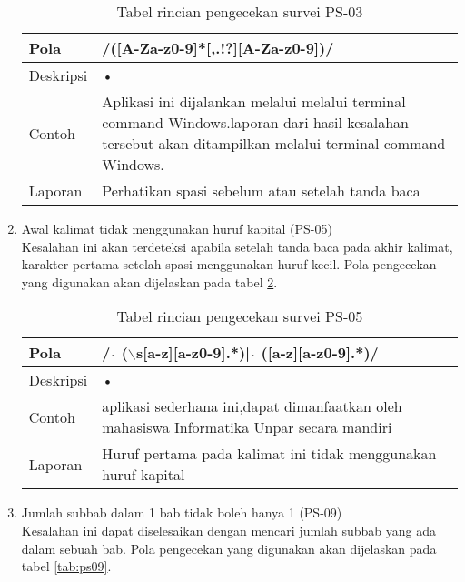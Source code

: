 \begin{enumerate}
	\begin{table}[H]
		\renewcommand{\arraystretch}{1.5}
		\caption {Tabel rincian pengecekan survei PS-03} 
		\label{tab:ps03}
		\begin{center}
			\begin{tabular}{|p{3.5cm} |p{10.5cm}|}
			\hline 
			Pola & /([A-Za-z0-9]*[,.!?][A-Za-z0-9])/ \\ 
			\hline 
			Deskripsi & • \\ 
			\hline 
			Contoh & Aplikasi ini dijalankan melalui melalui terminal command Windows.laporan dari hasil kesalahan tersebut akan ditampilkan melalui terminal command Windows. \\ 
			\hline 
			Laporan & Perhatikan spasi sebelum atau setelah tanda baca \\ 
			\hline
			\end{tabular}
		\end{center}
	\end{table}
	
	\item Awal kalimat tidak menggunakan huruf kapital (PS-05) \\
	Kesalahan ini akan terdeteksi apabila setelah tanda baca pada akhir kalimat, karakter pertama setelah spasi menggunakan huruf kecil. Pola pengecekan yang digunakan akan dijelaskan pada tabel \ref{tab:ps05}.
		
	\begin{table}[H]
		\renewcommand{\arraystretch}{1.5}
		\caption {Tabel rincian pengecekan survei PS-05} 
		\label{tab:ps05}
		\begin{center}
			\begin{tabular}{|p{3.5cm} |p{10.5cm}|}
			\hline 
			Pola & / $\hat{}$ ($\backslash$s[a-z][a-z0-9].*)| $\hat{}$ ([a-z][a-z0-9].*)/ \\ 
			\hline 
			Deskripsi & • \\ 
			\hline 
			Contoh & aplikasi sederhana ini,dapat dimanfaatkan oleh mahasiswa Informatika Unpar secara mandiri \\ 
			\hline 
			Laporan & Huruf pertama pada kalimat ini tidak menggunakan huruf kapital \\ 
			\hline
			\end{tabular}
		\end{center}
	\end{table}
	
	\item Jumlah subbab dalam 1 bab tidak boleh hanya 1 (PS-09) \\
	Kesalahan ini dapat diselesaikan dengan mencari jumlah subbab yang ada dalam sebuah bab. Pola pengecekan yang digunakan akan dijelaskan pada tabel \ref{tab:ps09}.
		

\end{enumerate}
